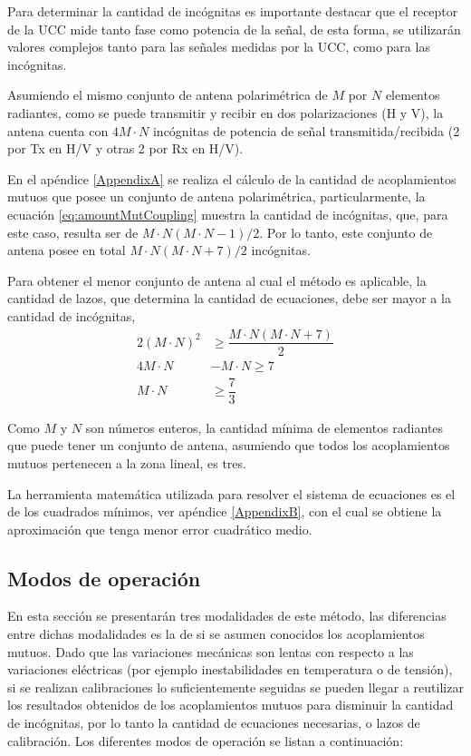Para determinar la cantidad de incógnitas es importante destacar que el receptor de la UCC mide tanto fase como potencia de la
señal, de esta forma, se utilizarán valores complejos tanto para las señales medidas por la UCC, como para las incógnitas.

Asumiendo el mismo conjunto de antena polarimétrica de $M$ por $N$ elementos radiantes, como se puede transmitir y recibir en
dos polarizaciones (H y V), la antena cuenta con $4M\cdot N$ incógnitas de potencia de señal transmitida/recibida (2 por Tx en H/V y
otras 2 por Rx en H/V).

En el apéndice \ref{AppendixA} se realiza el cálculo de la cantidad de acoplamientos mutuos que posee un conjunto de antena
polarimétrica, particularmente, la ecuación \ref{eq:amountMutCoupling} muestra la cantidad de incógnitas, que, para este caso,
resulta ser de $M\cdot N(M\cdot N-1)/2$. Por lo tanto, este conjunto de antena posee en total $M\cdot N(M\cdot N + 7)/2$ incógnitas.

Para obtener el menor conjunto de antena al cual el método es aplicable, la cantidad de lazos, que determina la cantidad de
ecuaciones, debe ser mayor a la cantidad de incógnitas, 
$$
\begin{aligned}
	2(M\cdot N)^2 &\ge  \dfrac{M\cdot N(M\cdot N + 7)}{2} \\
	4M\cdot N &- M\cdot N \ge7 \\
	M\cdot N &\ge \dfrac{7}{3}
\end{aligned}
$$

Como $M$ y $N$ son números enteros, la cantidad mínima de elementos radiantes que puede tener un conjunto de antena, asumiendo
que todos los acoplamientos mutuos pertenecen a la zona lineal, es tres.

La herramienta matemática utilizada para resolver el sistema de ecuaciones es el de los cuadrados mínimos,
ver apéndice \ref{AppendixB}, con el cual se obtiene la aproximación que tenga menor error cuadrático medio.


\subsection{Modos de operación}
\label{ssc:operationalModes}

En esta sección se presentarán tres modalidades de este método, las diferencias entre dichas modalidades es la de si se asumen
conocidos los acoplamientos mutuos. Dado que las variaciones mecánicas son lentas con respecto a las variaciones eléctricas
(por ejemplo inestabilidades en temperatura o de tensión), si se realizan calibraciones lo suficientemente seguidas se pueden
llegar a reutilizar los resultados obtenidos de los acoplamientos mutuos para disminuir la cantidad de incógnitas, por lo tanto
la cantidad de ecuaciones necesarias, o lazos de calibración. Los diferentes modos de operación se listan a continuación:

